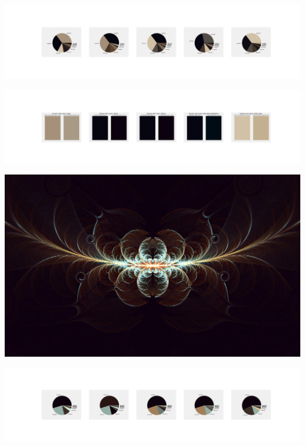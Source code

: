 \documentclass[11pt]{article}
\begin{document}
\begin{landscape}
    \begin{center}
    \includegraphics[width=250mm]{./nbimg/pie-422.jpg}
    \end{center}

    \begin{center}
    \includegraphics[width=250mm]{./nbimg/peak-422.jpg}
    \end{center}
    

    \begin{center}
    \includegraphics[width=\textwidth]{./nbimg/file (74).jpg}
    \end{center}

    \begin{center}
    \includegraphics[width=250mm]{./nbimg/pie-423.jpg}
    \end{center}


\end{landscape}
\end{document}
